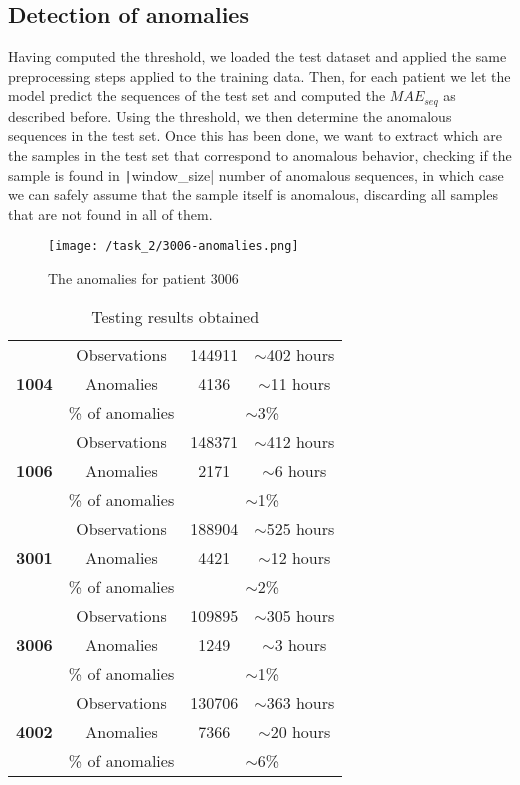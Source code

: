 \documentclass[12pt,a4paper,leqno]{article}
\begin{document}
	\subsection{Detection of anomalies}
	Having computed the threshold, we loaded the test dataset and applied the same preprocessing steps applied to the training data. Then, for each patient we let the model predict the sequences of the test set and computed the $MAE_{seq}$ as described before. Using the threshold, we then determine the anomalous sequences in the test set. Once this has been done, we want to extract which are the samples in the test set that correspond to anomalous behavior, checking if the sample is found in \texttt|window_size| number of anomalous sequences, in which case we can safely assume that the sample itself is anomalous, discarding all samples that are not found in all of them.
	\begin{figure}
		\centering
		\texttt{[image: /task\_2/3006-anomalies.png]}
		\caption{The anomalies for patient 3006}
		\label{task_2/3006-anomalies}
	\end{figure}
	\begin{table}
		\centering
		\begin{tabular}{|c|c|c|c|}
			\hline
			\multirow{3}{4em}{\textbf{1004}} & Observations & 144911 & $\sim$402 hours \\
			& Anomalies & 4136 & $\sim$11 hours \\ \cline{3-4}
			& \% of anomalies & \multicolumn{2}{|c|}{$\sim$3\%} \\
			\hline
			\hline
			\multirow{3}{4em}{\textbf{1006}} & Observations & 148371 & $\sim$412 hours \\
			& Anomalies & 2171 & $\sim$6 hours \\ \cline{3-4}
			& \% of anomalies & \multicolumn{2}{|c|}{$\sim$1\%} \\
			\hline
			\hline
			\multirow{3}{4em}{\textbf{3001}} & Observations & 188904 & $\sim$525 hours \\
			& Anomalies & 4421 & $\sim$12 hours \\ \cline{3-4}
			& \% of anomalies & \multicolumn{2}{|c|}{$\sim$2\%} \\
			\hline
			\hline
			\multirow{3}{4em}{\textbf{3006}} & Observations & 109895 & $\sim$305 hours \\
			& Anomalies & 1249 & $\sim$3 hours \\ \cline{3-4}
			& \% of anomalies & \multicolumn{2}{|c|}{$\sim$1\%} \\
			\hline
			\hline
			\multirow{3}{4em}{\textbf{4002}} & Observations & 130706 & $\sim$363 hours \\
			& Anomalies & 7366 & $\sim$20 hours \\ \cline{3-4}
			& \% of anomalies & \multicolumn{2}{|c|}{$\sim$6\%} \\
			\hline
		\end{tabular}
		\caption{Testing results obtained}
		\label{task_2/evaluations_table}
	\end{table}
\end{document}
